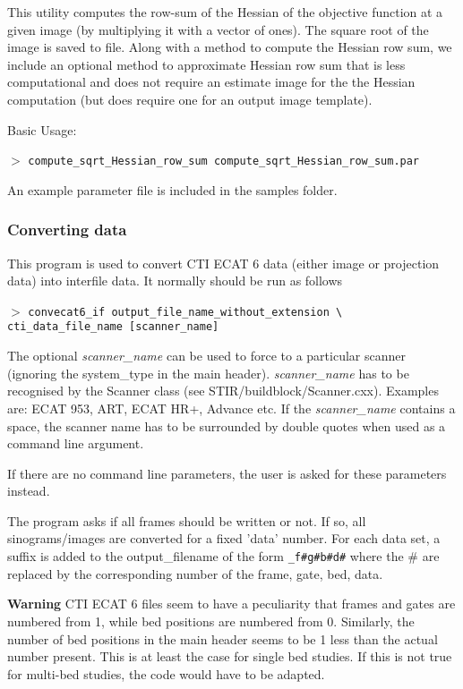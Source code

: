 \documentclass{article}
\newcommand{\cmdline}[1]{\par \noindent $>$ \texttt{#1}\par}
\begin{document}
{{This utility computes the row-sum of the Hessian of the objective function at a given image (by multiplying it with a vector of ones). The square root of the image is saved to file. Along with a method
to compute the Hessian row sum, we include an optional method to approximate Hessian row sum that is less computational
and does not require an estimate image for the the Hessian computation (but does require one for an output image
template).

Basic Usage:
\cmdline{compute\_sqrt\_Hessian\_row\_sum compute\_sqrt\_Hessian\_row\_sum.par}
An example parameter file is included in the samples folder.

\subsubsection{
Converting data}
\label{sec:convertingdata}
This program is used to convert CTI ECAT 6 data (either image 
or projection data) into interfile data. It normally should be 
run as follows
\cmdline{convecat6\_if output\_file\_name\_without\_extension {\textbackslash}\\
cti\_data\_file\_name [scanner\_name]}


The optional \textit{scanner\_name} can be used to force to a particular 
scanner (ignoring the system\_type in the main header). \textit{scanner\_name} 
has to be recognised by the Scanner class (see STIR/buildblock/Scanner.cxx). 
Examples are: ECAT 953, ART, ECAT HR+, Advance etc. If the \textit{scanner\_name} 
contains a space, the scanner name has to be surrounded by double 
quotes  when used as a command line argument.


If there are no command line parameters, the user is asked for 
these parameters instead. 


The program asks if all frames should be written or not. If so, 
all sinograms/images are converted for a fixed 'data' number. 
For each data set, a suffix is added to the output\_filename 
of the form \texttt{\_f\#g\#b\#d\#} where the \# are replaced 
by the corresponding number of the frame, gate, bed, data.



\textbf{Warning} CTI ECAT 6 files seem to have a peculiarity that 
frames and gates are numbered from 1, while bed positions are 
numbered from 0. Similarly, the number of bed positions in the 
main header seems to be 1 less than the actual number present. 
This is at least the case for single bed studies. If this is 
not true for multi-bed studies, the code would have to be adapted.


}}
\end{document}
